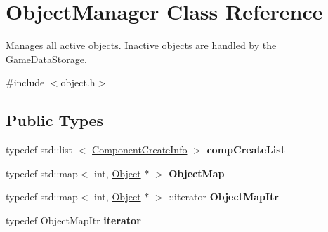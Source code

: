 \hypertarget{classObjectManager}{
\section{\-Object\-Manager \-Class \-Reference}
\label{d6/d6f/classObjectManager}
}


\-Manages all active objects. \-Inactive objects are handled by the \hyperlink{classGameDataStorage}{\-Game\-Data\-Storage}.  




{\ttfamily \#include $<$object.\-h$>$}

\subsection*{\-Public \-Types}
\begin{DoxyCompactItemize}
\item 
\hypertarget{classObjectManager_a60f8da162c9922d0f162742427b4a657}{
typedef std\-::list\*
$<$ \hyperlink{structComponentCreateInfo}{\-Component\-Create\-Info} $>$ {\bfseries comp\-Create\-List}}
\label{d6/d6f/classObjectManager_a60f8da162c9922d0f162742427b4a657}

\item 
\hypertarget{classObjectManager_ad9c27d50795992b7411490d3cf15c273}{
typedef std\-::map$<$ int, \hyperlink{classObject}{\-Object} $\ast$ $>$ {\bfseries \-Object\-Map}}
\label{d6/d6f/classObjectManager_ad9c27d50795992b7411490d3cf15c273}

\item 
\hypertarget{classObjectManager_ae5b72540cc7d9b0db6a5d973042d5abb}{
typedef std\-::map$<$ int, \hyperlink{classObject}{\-Object} $\ast$ $>$\*
\-::iterator {\bfseries \-Object\-Map\-Itr}}
\label{d6/d6f/classObjectManager_ae5b72540cc7d9b0db6a5d973042d5abb}

\item 
\hypertarget{classObjectManager_ac3c04689acbeec175c38510b64754ed5}{
typedef \-Object\-Map\-Itr {\bfseries iterator}}
\label{d6/d6f/classObjectManager_ac3c04689acbeec175c38510b64754ed5}

\end{DoxyCompactItemize}
